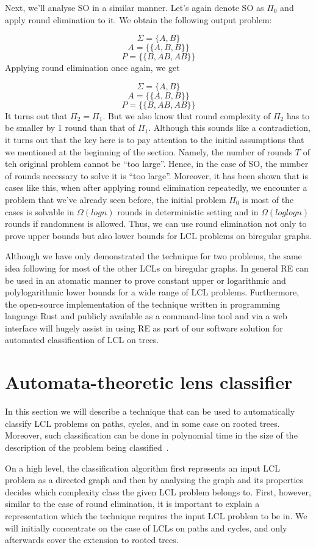 Next, we'll analyse SO in a similar manner. Let's again denote SO as $\Pi_0$ and apply
round elimination to it. We obtain the following output problem:

$$\Sigma = \{A, B\}$$
$$A = \{ \{A, B, B\} \}$$
$$P = \{ \{B, AB, AB\}\}$$
Applying round elimination once again, we get

$$\Sigma = \{A, B\}$$
$$A = \{ \{A, B, B\} \}$$
$$P = \{ \{B, AB, AB\}\}$$
It turns out that $\Pi_2 = \Pi_1$. But we also know that round complexity of $\Pi_2$
has to be smaller by 1 round than that of $\Pi_1$. Although this sounds like a contradiction,
it turns out that the key here is to pay attention to the initial assumptions that we mentioned at the
beginning of the section. Namely, the number of rounds $T$ of teh original problem cannot be ``too large''.
Hence, in the case of SO, the number of rounds necessary to solve it is ``too large''. Moreover,
it has been shown that is cases like this, when after applying round elimination repeatedly,
we encounter a problem that we've already seen before, the initial problem $\Pi_0$ is most of the cases
is solvable in $\Omega(log n)$ rounds in deterministic setting and in $\Omega(loglog n)$ rounds
if randomness is allowed. Thus, we can use round elimination not only to prove upper bounds but
also lower bounds for LCL problems on biregular graphs.

Although we have only demonstrated the technique for two problems, the same idea following for most of the
other LCLs on biregular graphs. In general RE can be used in an atomatic manner to prove constant upper or
logarithmic and polylogarithmic lower bounds for a wide range of LCL problems. Furthermore, the open-source
implementation
of the technique written in programming language Rust and publicly available as a command-line tool and via
a web interface will hugely assist in using RE as part of our software solution for automated classification
of LCL on trees.

\section{Automata-theoretic lens classifier}

In this section we will describe a technique that can be used to automatically
classify LCL problems on paths, cycles, and in some case on rooted trees.
Moreover, such classification can be done in polynomial time in the size
of the description of the problem being classified~\cite{Chang2020}.

On a high level, the classification algorithm first represents an input LCL problem as
a directed graph and then by analysing the graph and its properties decides
which complexity class the given LCL problem belongs to. First, however, similar to
the case of round elimination, it is important to explain a representation which
the technique requires the input LCL problem to be in. We will initially concentrate on the case
of LCLs on paths and cycles, and only afterwards cover the extension to rooted trees.

